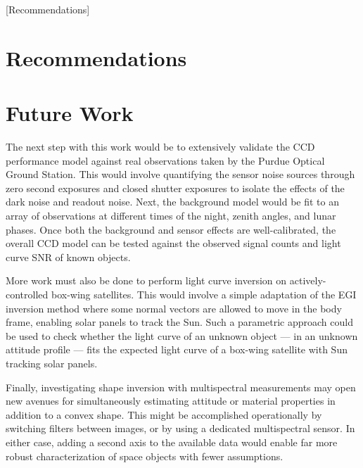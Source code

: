 [Recommendations]
\chapter{Recommendations}

\chapter{Future Work}

The next step with this work would be to extensively validate the CCD performance model against real observations taken by the Purdue Optical Ground Station. This would involve quantifying the sensor noise sources through zero second exposures and closed shutter exposures to isolate the effects of the dark noise and readout noise. Next, the background model would be fit to an array of observations at different times of the night, zenith angles, and lunar phases. Once both the background and sensor effects are well-calibrated, the overall CCD model can be tested against the observed signal counts and light curve SNR of known objects.

More work must also be done to perform light curve inversion on actively-controlled box-wing satellites. This would involve a simple adaptation of the EGI inversion method where some normal vectors are allowed to move in the body frame, enabling solar panels to track the Sun. Such a parametric approach could be used to check whether the light curve of an unknown object --- in an unknown attitude profile --- fits the expected light curve of a box-wing satellite with Sun tracking solar panels. 

Finally, investigating shape inversion with multispectral measurements may open new avenues for simultaneously estimating attitude or material properties in addition to a convex shape. This might be accomplished operationally by switching filters between images, or by using a dedicated multispectral sensor. In either case, adding a second axis to the available data would enable far more robust characterization of  space objects with fewer assumptions.